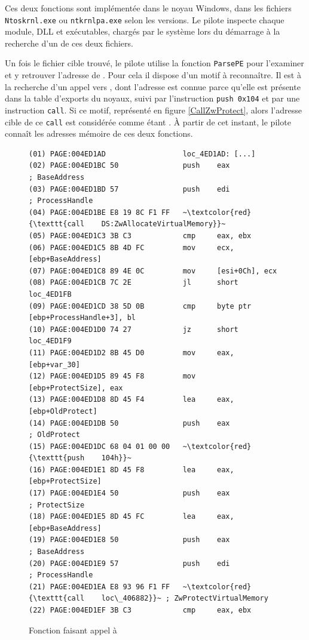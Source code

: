 Ces deux fonctions sont implémentée dans le noyau Windows, dans les fichiers \texttt{Ntoskrnl.exe} ou \texttt{ntkrnlpa.exe} selon les versions. 
Le pilote inspecte chaque module, DLL et exécutables, chargés par le système lors du démarrage à la recherche d'un de ces deux fichiers.

Un fois le fichier cible trouvé, le pilote utilise la fonction \texttt{ParsePE} pour l'examiner et y retrouver l'adresse de \ZwP.
Pour cela il dispose d'un motif à reconnaître.
Il est à la recherche d'un appel vers \ZwA, dont l'adresse est connue parce qu'elle est présente dans la table d'exports du noyaux, suivi par l'instruction \texttt{push 0x104} et par une instruction \texttt{call}.
Si ce motif, représenté en figure \ref{CallZwProtect}, alors l'adresse cible de ce \texttt{call} est considérée comme étant \ZwP.
À partir de cet instant, le pilote connaît les adresses mémoire de ces deux fonctions.

\begin{figure}
\scriptsize
\begin{lstlisting}[language={[x86masm]Assembler}, escapechar=~]
(01) PAGE:004ED1AD                  loc_4ED1AD: [...]                      
(02) PAGE:004ED1BC 50               push    eax             ; BaseAddress
(03) PAGE:004ED1BD 57               push    edi             ; ProcessHandle
(04) PAGE:004ED1BE E8 19 8C F1 FF   ~\textcolor{red}{\texttt{call    DS:ZwAllocateVirtualMemory}}~
(05) PAGE:004ED1C3 3B C3            cmp     eax, ebx
(06) PAGE:004ED1C5 8B 4D FC         mov     ecx, [ebp+BaseAddress]
(07) PAGE:004ED1C8 89 4E 0C         mov     [esi+0Ch], ecx
(08) PAGE:004ED1CB 7C 2E            jl      short loc_4ED1FB
(09) PAGE:004ED1CD 38 5D 0B         cmp     byte ptr [ebp+ProcessHandle+3], bl
(10) PAGE:004ED1D0 74 27            jz      short loc_4ED1F9
(11) PAGE:004ED1D2 8B 45 D0         mov     eax, [ebp+var_30]
(12) PAGE:004ED1D5 89 45 F8         mov     [ebp+ProtectSize], eax
(13) PAGE:004ED1D8 8D 45 F4         lea     eax, [ebp+OldProtect]
(14) PAGE:004ED1DB 50               push    eax             ; OldProtect
(15) PAGE:004ED1DC 68 04 01 00 00   ~\textcolor{red}{\texttt{push    104h}}~
(16) PAGE:004ED1E1 8D 45 F8         lea     eax, [ebp+ProtectSize]
(17) PAGE:004ED1E4 50               push    eax             ; ProtectSize
(18) PAGE:004ED1E5 8D 45 FC         lea     eax, [ebp+BaseAddress]
(19) PAGE:004ED1E8 50               push    eax             ; BaseAddress
(20) PAGE:004ED1E9 57               push    edi             ; ProcessHandle
(21) PAGE:004ED1EA E8 93 96 F1 FF   ~\textcolor{red}{\texttt{call    loc\_406882}}~ ; ZwProtectVirtualMemory
(22) PAGE:004ED1EF 3B C3            cmp     eax, ebx
\end{lstlisting}
\caption{Fonction faisant appel à \ZwP\label{fig:CallZwProtect}}
\end{figure}


